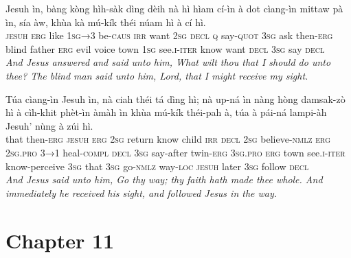 \documentclass[11pt,a4paper]{article}
\begin{document}
\begin{exe}
\gll Jesuh ìn, bàng kòng hìh-sàk dìng dèih nà hì hìam cí-ìn à dot cìang-ìn mittaw pà ìn, sía àw, khùa kà mú-kík théi núam hì à cí hì. \\
     \textsc{jesuh} \textsc{erg} like \textsc{1sg→3} be-\textsc{caus} \textsc{irr} want \textsc{2sg} \textsc{decl} \textsc{q} say-\textsc{quot} \textsc{3sg} ask then-\textsc{erg} blind father \textsc{erg} evil voice town \textsc{1sg} see.\textsc{i}-\textsc{iter} know want \textsc{decl} \textsc{3sg} say \textsc{decl} \\
\glt \textcolor{kjvcolor}{\textit{And Jesus answered and said unto him, What wilt thou that I should do unto thee? The blind man said unto him, Lord, that I might receive my sight.}}

\gll Túa cìang-ìn Jesuh ìn, nà ciah théi tá dìng hì; nà up-ná ìn nàng hòng damsak-zò hì à cìh-khit phèt-ìn àmàh ìn khùa mú-kík théi-pah à, túa à pái-ná lampi-àh Jesuh' nùng à zúi hì. \\
     that then-\textsc{erg} \textsc{jesuh} \textsc{erg} \textsc{2sg} return know child \textsc{irr} \textsc{decl} \textsc{2sg} believe-\textsc{nmlz} \textsc{erg} \textsc{2sg}.\textsc{pro} \textsc{3→1} heal-\textsc{compl} \textsc{decl} \textsc{3sg} say-after twin-\textsc{erg} \textsc{3sg}.\textsc{pro} \textsc{erg} town see.\textsc{i}-\textsc{iter} know-perceive \textsc{3sg} that \textsc{3sg} go-\textsc{nmlz} way-\textsc{loc} \textsc{jesuh} later \textsc{3sg} follow \textsc{decl} \\
\glt \textcolor{kjvcolor}{\textit{And Jesus said unto him, Go thy way; thy faith hath made thee whole. And immediately he received his sight, and followed Jesus in the way.}}

\end{exe}
\newpage

\section*{Chapter 11}
\end{document}
